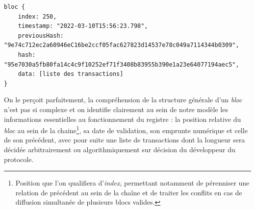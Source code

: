 {\begin{lstlisting}
bloc {
	index: 250,
	timestamp: "2022-03-10T15:56:23.798",
	previousHash: "9e74c712ec2a60946eC16be2ccf05fac627823d14537e78c049a7114344b0309",
	hash: "95e7030a5fb80fa14c4c9f10252ef71f3408b83955b390e1a23e64077194aec5",
	data: [liste des transactions]
}
\end{lstlisting}\par
On le perçoit parfaitement, la compréhension de la structure générale d'un \emph{bloc} n'est pas si complexe et on identifie clairement au sein de notre modèle les informations essentielles au fonctionnement du registre : la position relative du \emph{bloc} au sein de la chaine\footnote{Position que l'on qualifiera d'\emph{index}, permettant notamment de pérenniser une relation de précédent au sein de la chaîne et de traiter les conflits en cas de diffusion simultanée de plusieurs blocs valides.}, sa date de validation, son emprunte numérique et celle de son précédent, avec pour suite une liste de transactions dont la longueur sera décidée arbitrairement ou algorithmiquement sur décision du développeur du protocole.\par

}
